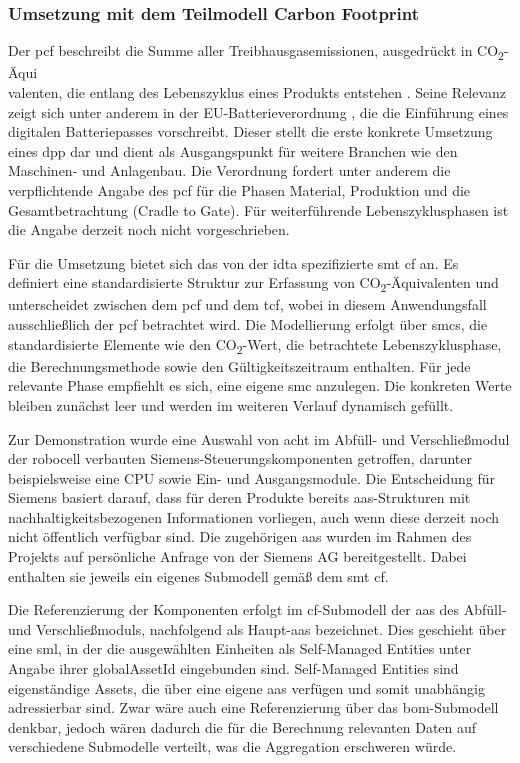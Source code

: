 \subsubsection{Umsetzung mit dem Teilmodell Carbon Footprint}
Der \acs{pcf} beschreibt die Summe aller Treibhausgasemissionen, ausgedrückt in CO\textsubscript{2}-Äqui\\valenten, die entlang des Lebenszyklus eines Produkts entstehen \cite{PCF}. 
Seine Relevanz zeigt sich unter anderem in der EU-Batterieverordnung \cite{EUVerordnung}, die die Einführung eines digitalen Batteriepasses vorschreibt. 
Dieser stellt die erste konkrete Umsetzung eines \acs{dpp} dar und dient als Ausgangspunkt für weitere Branchen wie den Maschinen- und Anlagenbau. 
Die Verordnung fordert unter anderem die verpflichtende Angabe des \acs{pcf} für die Phasen Material, Produktion und die Gesamtbetrachtung (Cradle to Gate). 
Für weiterführende Lebenszyklusphasen ist die Angabe derzeit noch nicht vorgeschrieben.

Für die Umsetzung bietet sich das von der \acs{idta} spezifizierte \acs{smt} \acs{cf} \cite{SpezifikaitonPCF} an.
Es definiert eine standardisierte Struktur zur Erfassung von CO\textsubscript{2}-Äquivalenten und unterscheidet zwischen dem \acs{pcf} und dem \ac{tcf}, wobei in diesem Anwendungsfall ausschließlich der \acs{pcf} betrachtet wird.
Die Modellierung erfolgt über \acsp{smc}, die standardisierte Elemente wie den CO\textsubscript{2}-Wert, die betrachtete Lebenszyklusphase, die Berechnungsmethode sowie den Gültigkeitszeitraum enthalten.
Für jede relevante Phase empfiehlt es sich, eine eigene \acs{smc} anzulegen.
Die konkreten Werte bleiben zunächst leer und werden im weiteren Verlauf dynamisch gefüllt.

Zur Demonstration wurde eine Auswahl von acht im Abfüll- und Verschließmodul der robocell verbauten Siemens-Steuerungskomponenten getroffen, darunter beispielsweise eine CPU sowie Ein- und Ausgangsmodule.
Die Entscheidung für Siemens basiert darauf, dass für deren Produkte bereits \acs{aas}-Strukturen mit nachhaltigkeitsbezogenen Informationen vorliegen, auch wenn diese derzeit noch nicht öffentlich verfügbar sind.
Die zugehörigen \acs{aas} wurden im Rahmen des Projekts auf persönliche Anfrage von der Siemens AG bereitgestellt. 
Dabei enthalten sie jeweils ein eigenes Submodell gemäß dem \acs{smt} \acs{cf}.

\clearpage
Die Referenzierung der Komponenten erfolgt im \acs{cf}-Submodell der \acs{aas} des Abfüll- und Verschließmoduls, nachfolgend als Haupt-\acs{aas} bezeichnet.
Dies geschieht über eine \acs{sml}, in der die ausgewählten Einheiten als Self-Managed Entities unter Angabe ihrer globalAssetId eingebunden sind.
Self-Managed Entities sind eigenständige Assets, die über eine eigene \acs{aas} verfügen und somit unabhängig adressierbar sind.
Zwar wäre auch eine Referenzierung über das \acs{bom}-Submodell denkbar, jedoch wären dadurch die für die Berechnung relevanten Daten auf verschiedene Submodelle verteilt, was die Aggregation erschweren würde.

